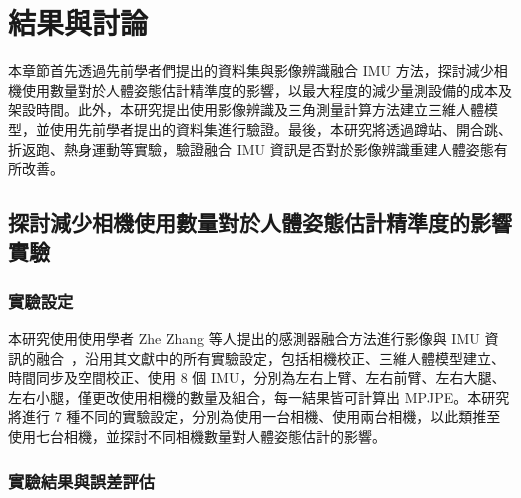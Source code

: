 \chapter{結果與討論}
\fontsize{12pt}{18pt}\selectfont %

本章節首先透過先前學者們提出的資料集與影像辨識融合 IMU 方法，探討減少相機使用數量對於人體姿態估計精準度的影響，以最大程度的減少量測設備的成本及架設時間。此外，本研究提出使用影像辨識及三角測量計算方法建立三維人體模型，並使用先前學者提出的資料集進行驗證。最後，本研究將透過蹲站、開合跳、折返跑、熱身運動等實驗，驗證融合 IMU 資訊是否對於影像辨識重建人體姿態有所改善。

\section{探討減少相機使用數量對於人體姿態估計精準度的影響實驗}\label{ch4_sec_cameraset}
\subsection{實驗設定}
本研究使用使用學者 Zhe Zhang 等人提出的感測器融合方法進行影像與 IMU 資訊的融合~\cite{Zhang_2020_CVPR}，沿用其文獻中的所有實驗設定，包括相機校正、三維人體模型建立、時間同步及空間校正、使用 8 個 IMU，分別為左右上臂、左右前臂、左右大腿、左右小腿，僅更改使用相機的數量及組合，每一結果皆可計算出 MPJPE。本研究將進行 7 種不同的實驗設定，分別為使用一台相機、使用兩台相機，以此類推至使用七台相機，並探討不同相機數量對人體姿態估計的影響。

\clearpage

\subsection{實驗結果與誤差評估}

